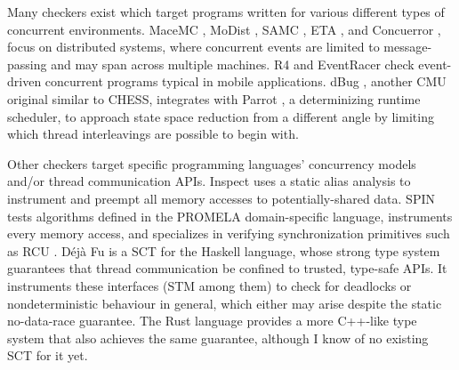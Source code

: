 Many checkers exist which target programs written for various different types of concurrent environments.
MaceMC \cite{macemc}, MoDist \cite{modist}, SAMC \cite{samc}, ETA \cite{dbug-retreat}, and Concuerror \cite{concuerror},
focus on distributed systems, where concurrent events are limited to message-passing and may span across multiple machines.
R4 \cite{r4} and EventRacer \cite{eventracer} check event-driven concurrent programs typical in mobile applications.
dBug \cite{dbug-ssv}, another CMU original similar to CHESS,
integrates with Parrot \cite{parrot}, a determinizing runtime scheduler,
to approach state space reduction from a different angle by limiting which thread interleavings are possible to begin with.

Other checkers target specific programming languages' concurrency models and/or thread communication APIs.
Inspect \cite{inspect} uses a static alias analysis to instrument and preempt all memory accesses to potentially-shared data.
SPIN \cite{spin} tests algorithms defined in the PROMELA domain-specific language,
instruments every memory access, and
specializes in verifying synchronization primitives such as RCU \cite{rcu}.
%
D\'{e}j\`{a} Fu \cite{dejafu} is a SCT
for the Haskell language,
whose strong type system guarantees that thread communication be confined to trusted, type-safe APIs.
It instruments these interfaces (STM among them)
to check for deadlocks or nondeterministic behaviour in general,
which either may arise despite the static no-data-race guarantee.
The Rust language \cite{rust-language}
provides a more C++-like type system that also
achieves the same guarantee, although I know of no existing SCT for it yet.

